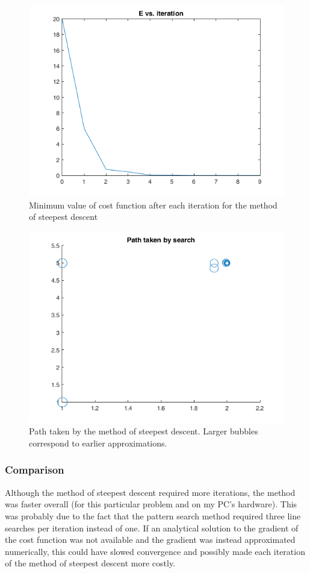 \documentclass{article}
\begin{document}
\begin{figure}
	\centering
	\includegraphics[width=0.75\linewidth]{E-vs-iteration-sd}
	\caption{Minimum value of cost function after each iteration for the method of steepest descent}
	\label{fig:error-sd}
\end{figure}

\begin{figure}
	\centering
	\includegraphics[width=0.75\linewidth]{path-taken-by-search-sd}
	\caption{Path taken by the method of steepest descent. Larger bubbles correspond to earlier approximations.}
	\label{fig:path-sd}
\end{figure}

\subsubsection{Comparison}

Although the method of steepest descent required more iterations, the method was faster overall (for this particular problem and on my PC's hardware).
This was probably due to the fact that the pattern search method required three line searches per iteration instead of one.
If an analytical solution to the gradient of the cost function was not available and the gradient was instead approximated numerically, this could have slowed convergence and possibly made each iteration of the method of steepest descent more costly.
\end{document}
